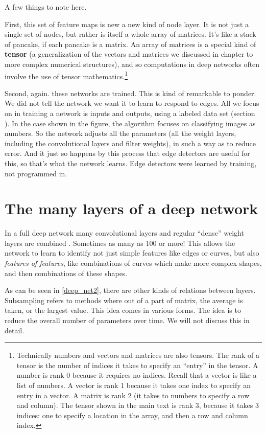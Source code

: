 A few things to note here.

First, this set of feature maps is new a new kind of node layer. It is not just a  single set of nodes, but rather is itself a whole array of matrices. It's like a stack of pancake, if each pancake is a matrix.  An array of matrices is a special kind of \textbf{tensor} (a generalization of the vectors and matrices we discussed in chapter  to more complex numerical structures), and so computations in deep networks often involve the use of tensor mathematics.\footnote{Technically numbers and vectors and matrices are also tensors. The rank of a  tensor is the number of indices it takes to specify an ``entry'' in the tensor. A number is rank 0 because it requires no indices. Recall that a vector is like a list of numbers. A vector is rank 1 because it takes one index to specify an entry in a vector. A matrix is rank 2 (it takes to numbers to specify a row and column). The tensor shown in the main text is rank 3, because it takes 3 indices: one to specify a location in the array, and then a row and column index.}  

Second, again. these networks are trained.  This is kind of remarkable to ponder. We did not tell the network we want it to learn to respond to edges. All we focus on in training a network is inputs and outputs, using a labeled data set (section ).  In the case shown in the figure, the algorithm focuses on classifying images as numbers. So the network adjusts all the parameters (all the weight layers, including the convolutional layers and filter weights), in such a way as to reduce error. And it just so happens by this process that edge detectors are useful for this, so that's what the network learns. Edge detectors were learned by training, not programmed in.

\section{The many layers of a deep network}

In a full deep network many convolutional layers and regular ``dense'' weight layers are combined . Sometimes as many as 100 or more! This allows the network to learn to identify not just simple features like edges or curves, but also \emph{features of features}, like combinations of curves which make more complex shapes, and then combinations of these shapes. 

As can be seen in  \ref{deep_net2}, there are other kinds of relations between layers. Subsampling refers to methods where out of a part of matrix, the average is taken, or the largest value. This idea comes in various forms. The idea is to reduce the overall number of parameters over time. We will not discuss this in detail.

